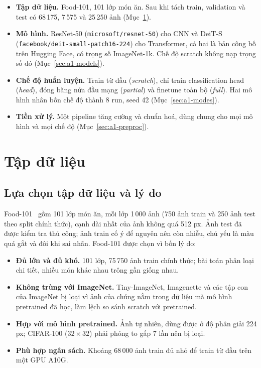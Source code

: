 \documentclass[a4paper,12pt]{article}
\begin{document}
\begin{itemize}
    \item \textbf{Tập dữ liệu.} Food-101, 101 lớp món ăn. Sau khi tách train, validation và test có 68\,175, 7\,575 và 25\,250 ảnh (Mục~\ref{sec:a1-dataset}).
    \item \textbf{Mô hình.} ResNet-50 (\texttt{microsoft/resnet-50}) cho CNN và DeiT-S (\texttt{facebook/deit-small-patch16-224}) cho Transformer, cả hai là bản công bố trên Hugging Face, có trọng số ImageNet-1k. Chế độ scratch không nạp trọng số đó (Mục~\ref{sec:a1-models}).
    \item \textbf{Chế độ huấn luyện.} Train từ đầu (\emph{scratch}), chỉ train classification head (\emph{head}), đóng băng nửa đầu mạng (\emph{partial}) và finetune toàn bộ (\emph{full}). Hai mô hình nhân bốn chế độ thành 8 run, seed 42 (Mục~\ref{sec:a1-modes}).
    \item \textbf{Tiền xử lý.} Một pipeline tăng cường và chuẩn hoá, dùng chung cho mọi mô hình và mọi chế độ (Mục~\ref{sec:a1-preproc}).
\end{itemize}

\section{Tập dữ liệu}\label{sec:a1-dataset}

\subsection{Lựa chọn tập dữ liệu và lý do}\label{sec:a1-reason}
Food-101~\cite{bossard2014food101} gồm 101 lớp món ăn, mỗi lớp 1\,000 ảnh (750 ảnh train và 250 ảnh test theo split chính thức), cạnh dài nhất của ảnh không quá 512 px. Ảnh test đã được kiểm tra thủ công; ảnh train cố ý để nguyên nên còn nhiễu, chủ yếu là màu quá gắt và đôi khi sai nhãn. Food-101 được chọn vì bốn lý do:
\begin{itemize}
    \item \textbf{Đủ lớn và đủ khó.} 101 lớp, 75\,750 ảnh train chính thức; bài toán phân loại chi tiết, nhiều món khác nhau trông gần giống nhau.
    \item \textbf{Không trùng với ImageNet.} Tiny-ImageNet, Imagenette và các tập con của ImageNet bị loại vì ảnh của chúng nằm trong dữ liệu mà mô hình pretrained đã học, làm lệch so sánh scratch với pretrained.
    \item \textbf{Hợp với mô hình pretrained.} Ảnh tự nhiên, dùng được ở độ phân giải 224 px; CIFAR-100 (\(32\times32\)) phải phóng to gấp 7 lần nên bị loại.
    \item \textbf{Phù hợp ngân sách.} Khoảng 68\,000 ảnh train đủ nhỏ để train từ đầu trên một GPU A10G.
\end{itemize}
\end{document}

